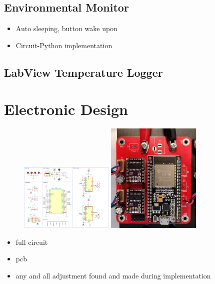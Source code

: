 \subsection{Environmental Monitor}

\begin{itemize}
    \item Auto sleeping, button wake upon
    \item Circuit-Python implementation
\end{itemize}

\subsection{LabView Temperature Logger}

\section{Electronic Design}

\begin{figure}
    \centering
    \includegraphics[width=0.4\textwidth]{img/schem.png}
    \includegraphics[width=0.4\textwidth]{img/control_pcb.jpg}
\end{figure}

\begin{itemize}
    \item full circuit
    \item pcb
    \item any and all adjustment found and made during implementation
\end{itemize}

